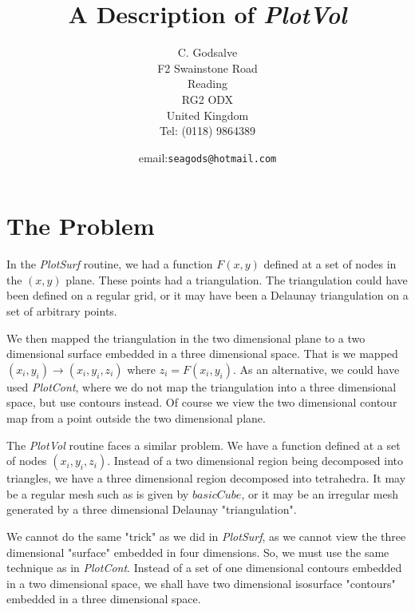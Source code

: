 \documentclass[12pt]{article}
\begin{document}
\thispagestyle{empty}

\title{A Description of {\it PlotVol}}


\author{C. Godsalve \\
F2 Swainstone Road \\
Reading\\
RG2 ODX \\
United Kingdom\\
Tel: (0118) 9864389}


\date{email:{\tt seagods@hotmail.com}}


\maketitle
\tableofcontents


\section{The Problem}

In the {\it PlotSurf} routine, we had a function $F(x,y)$ defined at a set
of nodes in the $(x,y)$ plane. These points had a triangulation. The
triangulation could have been defined on a regular grid, or it may have
been a Delaunay triangulation on a set of arbitrary points.

We then mapped the triangulation in the two dimensional plane to
a two dimensional surface embedded in a three dimensional space.
That is we mapped $(x_i, y_i) \rightarrow (x_i,y_i,z_i)$ where
 $z_i=F(x_i, y_i)$. As an alternative, we could have used {\it PlotCont},
 where we do not map the triangulation into a three dimensional space, 
 but use contours instead. Of course we view the two dimensional 
contour map from a point outside the two dimensional plane.

The {\it PlotVol} routine faces a similar problem. We have a function
defined at a set of nodes $(x_i,y_i,z_i)$. Instead of  a two
dimensional region
being decomposed into triangles, we have a three dimensional region
decomposed into tetrahedra. It may be a regular mesh such as is given by 
$basicCube$, or it may be  an irregular mesh generated by a three
dimensional Delaunay "triangulation".

We cannot do the same "trick" as we did in {\it PlotSurf}, as we cannot view the three
dimensional "surface" embedded in four dimensions. So, we must use
the same technique as in {\it PlotCont}. Instead of a set of one dimensional
 contours embedded in a two dimensional space, we shall have two dimensional
 isosurface "contours" embedded in a three dimensional space.
\end{document}

